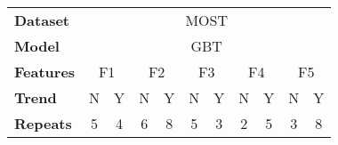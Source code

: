 \setcellgapes{1ex}\makegapedcells\centering\begin{tabular}{l|cccccccccc}
\toprule
\textbf{Dataset} & \multicolumn{10}{c}{MOST} \\
\textbf{Model} & \multicolumn{10}{c}{GBT} \\
\textbf{Features} & \multicolumn{2}{c}{F1} & \multicolumn{2}{c}{F2} & \multicolumn{2}{c}{F3} & \multicolumn{2}{c}{F4} & \multicolumn{2}{c}{F5} \\
\textbf{Trend} &    N &  Y &  N &  Y &  N &  Y &  N &  Y &  N &  Y \\
\midrule
\textbf{Repeats} &  5 &  4 &  6 &  8 &  5 &  3 &  2 &  5 &  3 &  8 \\
\bottomrule
\end{tabular}
